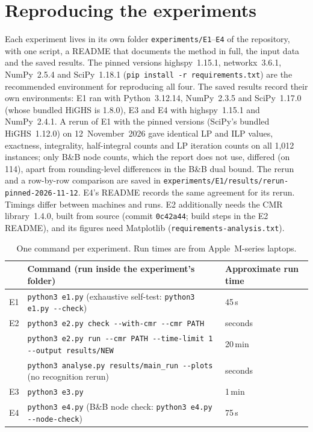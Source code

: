 \section{Reproducing the experiments}\label{app:repro}

Each experiment lives in its own folder \texttt{experiments/E1}--\texttt{E4} of the repository, with one script, a README that documents the method in full, the input data and the saved results. The pinned versions highspy~1.15.1, networkx~3.6.1, NumPy~2.5.4 and SciPy~1.18.1 (\texttt{pip install -r requirements.txt}) are the recommended environment for reproducing all four. The saved results record their own environments: E1 ran with Python~3.12.14, NumPy~2.3.5 and SciPy~1.17.0 (whose bundled HiGHS is 1.8.0), E3 and E4 with highspy~1.15.1 and NumPy~2.4.1. A rerun of E1 with the pinned versions (SciPy's bundled HiGHS~1.12.0) on 12~November~2026 gave identical LP and ILP values, exactness, integrality, half-integral counts and LP iteration counts on all 1,012 instances; only B\&B node counts, which the report does not use, differed (on 114), apart from rounding-level differences in the B\&B dual bound. The rerun and a row-by-row comparison are saved in \texttt{experiments/E1/results/rerun-pinned-2026-11-12}. E4's README records the same agreement for its rerun. Timings differ between machines and runs. E2 additionally needs the CMR library~1.4.0, built from source (commit \texttt{0c42a44}; build steps in the E2 README), and its figures need Matplotlib (\texttt{requirements-analysis.txt}).

\begin{table}[H]
  \centering\footnotesize
  \caption{One command per experiment. Run times are from Apple~M-series laptops.}
  \label{tab:commands}
  \begin{tabular}{@{}lll@{}}
    \toprule
    & Command (run inside the experiment's folder) & Approximate run time \\
    \midrule
    E1 & \texttt{python3 e1.py} \quad (exhaustive self-test: \texttt{python3 e1.py -{}-check}) & 45\,s \\
    E2 & \texttt{python3 e2.py check -{}-with-cmr -{}-cmr PATH} & seconds \\
       & \texttt{python3 e2.py run -{}-cmr PATH -{}-time-limit 1 -{}-output results/NEW} & 20\,min \\
       & \texttt{python3 analyse.py results/main\_run -{}-plots} \quad (no recognition rerun) & seconds \\
    E3 & \texttt{python3 e3.py} & 1\,min \\
    E4 & \texttt{python3 e4.py} \quad (B\&B node check: \texttt{python3 e4.py -{}-node-check}) & 75\,s \\
    \bottomrule
  \end{tabular}
\end{table}


